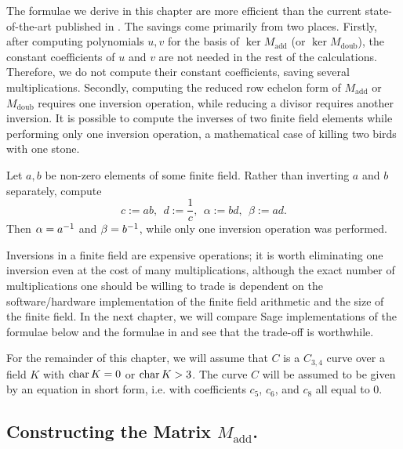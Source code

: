 The formulae we derive in this chapter are more efficient than the current state-of-the-art published in \cite{kmakdisi18}.
The savings come primarily from two places.
Firstly, after computing polynomials $u,v$ for the basis of $\ker M_{\text{add}}$ (or $\ker M_{\text{doub}}$),
the constant coefficients of $u$ and $v$ are not needed in the rest of the calculations.
Therefore, we do not compute their constant coefficients, saving several multiplications.
Secondly, computing the reduced row echelon form of $M_{\text{add}}$ or $M_{\text{doub}}$ requires one inversion
operation, while reducing a divisor requires another inversion.
It is possible to compute the inverses of two finite field elements while performing only one inversion operation,
a mathematical case of killing two birds with one stone.
\begin{example}
  \label{ex_two_birds_one_stone}
  Let $a, b$ be non-zero elements of some finite field.
  Rather than inverting $a$ and $b$ separately, compute
  \[ c := ab, ~~ d := \frac 1 c, ~~ \alpha := bd, ~~ \beta := ad. \]
  Then $\alpha = a^{-1}$ and $\beta = b^{-1}$, while only one inversion operation was performed.
\end{example}
Inversions in a finite field are expensive operations;
it is worth eliminating one inversion even at the cost of many multiplications,
although the exact number of multiplications one should be willing to trade is dependent on
the software/hardware implementation of the finite field arithmetic and the size of the finite field.
In the next chapter, we will compare Sage implementations of the formulae below and the formulae in \cite{kmakdisi18}
and see that the trade-off is worthwhile.

For the remainder of this chapter, we will assume that $C$ is a $C_{3,4}$ curve
over a field $K$ with $\operatorname{char} K = 0$ or $\operatorname{char} K > 3$.
The curve $C$ will be assumed to be given by an equation in short form,
i.e. with coefficients $c_5$, $c_6$, and $c_8$ all equal to 0.




\subsection{Constructing the Matrix $M_{\text{add}}$.}

